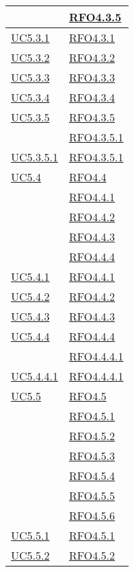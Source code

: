 \begin{longtable}{|>{\centering}m{5cm}|m{5cm}<{\centering}|}
& \hyperlink{RFO4.3.5}{RFO4.3.5}\\ \hline
\hyperref[UC5.3.1]{UC5.3.1} & \hyperlink{RFO4.3.1}{RFO4.3.1}\\ \hline
\hyperref[UC5.3.2]{UC5.3.2} & \hyperlink{RFO4.3.2}{RFO4.3.2}\\ \hline
\hyperref[UC5.3.3]{UC5.3.3} & \hyperlink{RFO4.3.3}{RFO4.3.3}\\ \hline
\hyperref[UC5.3.4]{UC5.3.4} & \hyperlink{RFO4.3.4}{RFO4.3.4}\\ \hline
\hyperref[UC5.3.5]{UC5.3.5} & \hyperlink{RFO4.3.5}{RFO4.3.5}\\
& \hyperlink{RFO4.3.5.1}{RFO4.3.5.1}\\ \hline
\hyperref[UC5.3.5.1]{UC5.3.5.1} & \hyperlink{RFO4.3.5.1}{RFO4.3.5.1}\\ \hline
\hyperref[UC5.4]{UC5.4} & \hyperlink{RFO4.4}{RFO4.4}\\
& \hyperlink{RFO4.4.1}{RFO4.4.1}\\
& \hyperlink{RFO4.4.2}{RFO4.4.2}\\
& \hyperlink{RFO4.4.3}{RFO4.4.3}\\
& \hyperlink{RFO4.4.4}{RFO4.4.4}\\ \hline
\hyperref[UC5.4.1]{UC5.4.1} & \hyperlink{RFO4.4.1}{RFO4.4.1}\\ \hline
\hyperref[UC5.4.2]{UC5.4.2} & \hyperlink{RFO4.4.2}{RFO4.4.2}\\ \hline
\hyperref[UC5.4.3]{UC5.4.3} & \hyperlink{RFO4.4.3}{RFO4.4.3}\\ \hline
\hyperref[UC5.4.4]{UC5.4.4} & \hyperlink{RFO4.4.4}{RFO4.4.4}\\
& \hyperlink{RFO4.4.4.1}{RFO4.4.4.1}\\ \hline
\hyperref[UC5.4.4.1]{UC5.4.4.1} & \hyperlink{RFO4.4.4.1}{RFO4.4.4.1}\\ \hline
\hyperref[UC5.5]{UC5.5} & \hyperlink{RFO4.5}{RFO4.5}\\
& \hyperlink{RFO4.5.1}{RFO4.5.1}\\
& \hyperlink{RFO4.5.2}{RFO4.5.2}\\
& \hyperlink{RFO4.5.3}{RFO4.5.3}\\
& \hyperlink{RFO4.5.4}{RFO4.5.4}\\
& \hyperlink{RFO4.5.5}{RFO4.5.5}\\
& \hyperlink{RFO4.5.6}{RFO4.5.6}\\ \hline
\hyperref[UC5.5.1]{UC5.5.1} & \hyperlink{RFO4.5.1}{RFO4.5.1}\\ \hline
\hyperref[UC5.5.2]{UC5.5.2} & \hyperlink{RFO4.5.2}{RFO4.5.2}\\ \hline

\end{longtable}
